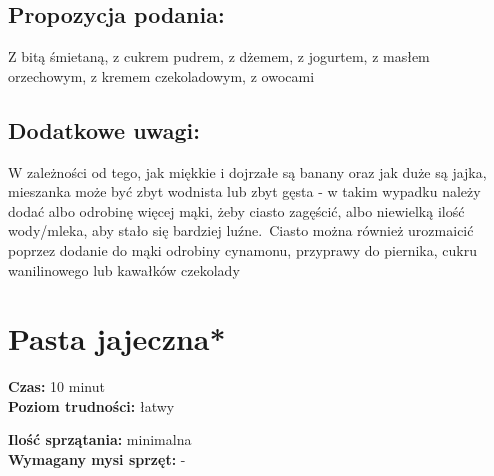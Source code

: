 \documentclass[a4paper,10pt]{book}
\begin{document}
\vspace{0.5cm}

\small \section*{Propozycja podania:} Z bitą śmietaną, z cukrem pudrem, z dżemem, z jogurtem, z masłem orzechowym, z kremem czekoladowym, z owocami

\vspace{0.3cm}

\section*{Dodatkowe uwagi:} W zależności od tego, jak miękkie i dojrzałe są banany oraz jak duże są jajka, mieszanka może być zbyt wodnista lub zbyt gęsta - w takim wypadku należy dodać albo odrobinę więcej mąki, żeby ciasto zagęścić, albo niewielką ilość wody/mleka, aby stało się bardziej luźne.\ Ciasto można również urozmaicić poprzez dodanie do mąki odrobiny cynamonu, przyprawy do piernika, cukru wanilinowego lub kawałków czekolady

\chapter{Pasta jajeczna*}

\vspace{0.1cm}
\small
\begin{minipage}{0.45\textwidth}
    \noindent \textbf{Czas:} 10 minut \\
    \textbf{Poziom trudności:} łatwy
\end{minipage}
\begin{minipage}{0.45\textwidth}
    \noindent \textbf{Ilość sprzątania:} minimalna\\
    \textbf{Wymagany mysi sprzęt:} -
\end{minipage}
\normalsize
\vspace{0.5cm}
\end{document}

